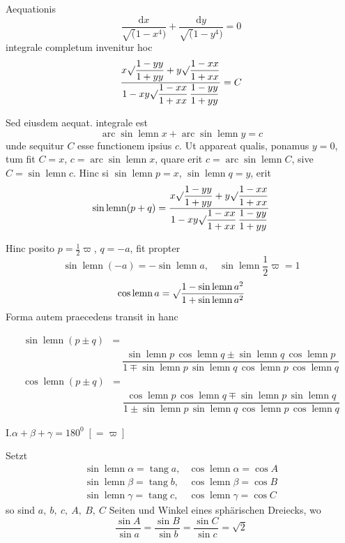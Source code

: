 Aequationis
\[
\dfrac{\mathrm{d}x}{\surd(1-x^4)}+\dfrac{\mathrm{d}y}{\surd(1-y^4)}=0
\]
integrale completum invenitur hoc
\[
\dfrac{x\surd\dfrac{1-yy}{1+yy}+y\surd\dfrac{1-xx}{1+xx}}
{1-xy\surd\dfrac{1-xx}{1+xx}\,\dfrac{1-yy}{1+yy}}=C
\]

Sed eiusdem aequat. integrale est
\[
\operatorname{arc}\sin\operatorname{lemn}x+\operatorname{arc}\sin\operatorname{lemn}y=c
\]
unde sequitur $C$ esse functionem ipsius $c$. Ut appareat qualis, ponamus $y=0$, tum fit $C=x$, $c=\operatorname{arc}\sin\operatorname{lemn}x$, quare erit $c=\operatorname{arc}\sin\operatorname{lemn}C$, sive $C=\sin\operatorname{lemn}c$. Hinc si $\sin\operatorname{lemn}p=x$, $\sin\operatorname{lemn}q=y$, erit
\[
\sin\operatorname{lemn}(p+q)=
\dfrac{x\surd\dfrac{1-yy}{1+yy}+y\surd\dfrac{1-xx}{1+xx}}
{1-xy\surd\dfrac{1-xx}{1+xx}\,\dfrac{1-yy}{1+yy}}
\]

Hinc posito $p=\tfrac12\varpi$, $q=-a$, fit propter
\[
\sin\operatorname{lemn}(-a)=-\sin\operatorname{lemn}a,\quad
\sin\operatorname{lemn}\dfrac12\varpi=1
\]
\[
\cos\operatorname{lemn}a=\surd\dfrac{1-\sin\operatorname{lemn}a^2}{1+\sin\operatorname{lemn}a^2}
\]
Forma autem praecedens transit in hanc


\[
\begin{aligned}\sin\operatorname{lemn}(p\pm q)&=\\[7pt]&\quad{}
\dfrac{\sin\operatorname{lemn}p\,\cos\operatorname{lemn}q\pm\sin\operatorname{lemn}q\,\cos\operatorname{lemn}p}
{1\mp\sin\operatorname{lemn}p\,\sin\operatorname{lemn}q\,\cos\operatorname{lemn}p\,\cos\operatorname{lemn}q}\end{aligned}
\]
\[
\begin{aligned}\cos\operatorname{lemn}(p\pm q)&=\\[7pt]&\quad{}
\dfrac{\cos\operatorname{lemn}p\,\cos\operatorname{lemn}q\mp\sin\operatorname{lemn}p\,\sin\operatorname{lemn}q}
{1\pm\sin\operatorname{lemn}p\,\sin\operatorname{lemn}q\,\cos\operatorname{lemn}p\,\cos\operatorname{lemn}q}\end{aligned}
\]


\noindent I.\hfill $\alpha+\beta+\gamma=180^0\;[=\varpi]$\hfill\mbox{}

Setzt
\[
\begin{array}{ll}
\sin\operatorname{lemn}\alpha=\operatorname{tang}a,&\cos\operatorname{lemn}\alpha=\cos A\\[5pt]
\sin\operatorname{lemn}\beta=\operatorname{tang}b,&\cos\operatorname{lemn}\beta=\cos B\\[5pt]
\sin\operatorname{lemn}\gamma=\operatorname{tang}c,&\cos\operatorname{lemn}\gamma=\cos C
\end{array}
\]
so sind $a,\ b,\ c,\ A,\ B,\ C$ Seiten und Winkel eines sphärischen Dreiecks, wo
\[
\dfrac{\sin A}{\sin a}=\dfrac{\sin B}{\sin b}=\dfrac{\sin C}{\sin c}=\surd2
\]

